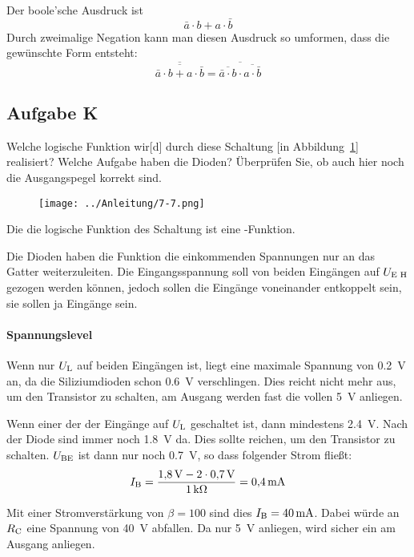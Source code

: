 Der boole'sche Ausdruck ist 
\[
    \bar a \cdot b + a \cdot \bar b
\]
Durch zweimalige Negation kann man diesen Ausdruck so umformen, dass die
gewünschte Form entsteht:
\[
    \overline{\overline{\bar a \cdot b + a \cdot \bar b}} =
    \overline{\overline{\bar a \cdot b} \cdot \overline{a \cdot \bar b}} 
\]

\FloatBarrier
\subsection{Aufgabe K}

\begin{problem}
	Welche logische Funktion wir[d] durch diese Schaltung [in
	Abbildung~\ref{fig:7-7}] realisiert? Welche Aufgabe haben die Dioden?
	Überprüfen Sie, ob auch hier noch die Ausgangspegel korrekt sind.
\end{problem}

\begin{figure}[htbp]
	\centering
	\texttt{[image: ../Anleitung/7-7.png]}
	\caption{%
		\cite[Abbildung~7.7]{physik313-Anleitung}
	}
	\label{fig:7-7}
\end{figure}

Die die logische Funktion des Schaltung ist eine \tnor-Funktion.

Die Dioden
haben die Funktion die einkommenden Spannungen nur an das Gatter
weiterzuleiten. Die Eingangsspannung soll von beiden Eingängen auf $\UEH$
gezogen werden können, jedoch sollen die Eingänge voneinander entkoppelt sein,
sie sollen ja Eingänge sein.

\paragraph{Spannungslevel}

Wenn nur $\UL$ auf beiden Eingängen ist, liegt eine maximale Spannung von
\SI{.2}{\volt} an, da die Siliziumdioden schon \SI{.6}{\volt} verschlingen.
Dies reicht nicht mehr aus, um den Transistor zu schalten, am Ausgang werden
fast die vollen \SI{5}{\volt} anliegen.

Wenn einer der der Eingänge auf $\UL$ geschaltet ist, dann mindestens
\SI{2.4}{\volt}. Nach der Diode sind immer noch \SI{1.8}{\volt} da. Dies sollte
reichen, um den Transistor zu schalten. $\UBE$ ist dann nur noch
\SI{.7}{\volt}, so dass folgender Strom fließt:
\[
	\IB = \frac{\SI{1.8}\volt - 2 \cdot \SI{.7}\volt}{\SI1{\kilo\ohm}}
	= \SI{.4}{\milli\ampere}
\]

Mit einer Stromverstärkung von $\beta = 100$ sind dies $\IB =
\SI{40}{\milli\ampere}$. Dabei würde an $\RC$ eine Spannung von \SI{40}{\volt}
abfallen. Da nur \SI{5}{\volt} anliegen, wird sicher ein \thigh{} am Ausgang
anliegen.

